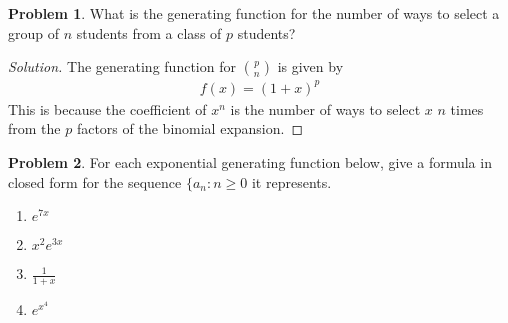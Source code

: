 \documentclass[12pt]{article}
\newcounter{chapternumber}
\theoremstyle{definition}
\newtheorem{problem-internal}{Problem}[chapternumber]
\newenvironment{problem}{
  \medskip
  \begin{problem-internal}
}{
\end{problem-internal}
}
\newenvironment{solution}{
  \begin{proof}[Solution]
    \vspace{-8px}
    \setlength{\parskip}{4px}
    \setlength{\parindent}{0px}
}{
\end{proof}
}
\begin{document}
  \setcounter{problem-internal}{8}
  \begin{problem}
    What is the generating function for the number of ways to select a group of \(n\) students from a class of \(p\) students?
  \end{problem}

  \begin{solution}
    The generating function for \({p \choose n}\) is given by
    \begin{align*}
      f(x) = (1 + x)^p
    \end{align*}
    This is because the coefficient of \(x^n\) is the number of ways to select \(x\) \(n\) times from the \(p\) factors of the binomial expansion.
  \end{solution}


  \setcounter{problem-internal}{20}
  \begin{problem}
    For each exponential generating function below, give a formula in closed form for the sequence \(\{a_{n}: n \geq 0\) it represents.
    \begin{enumerate}[label={\alph*.}]
      \item \(e^{7x}\)
      \item \(x^{2} e^{3x}\)
      \item \(\frac{1}{1+x}\)
      \item \(e^{x^{4}}\)
    \end{enumerate}
  \end{problem}
\end{document}
